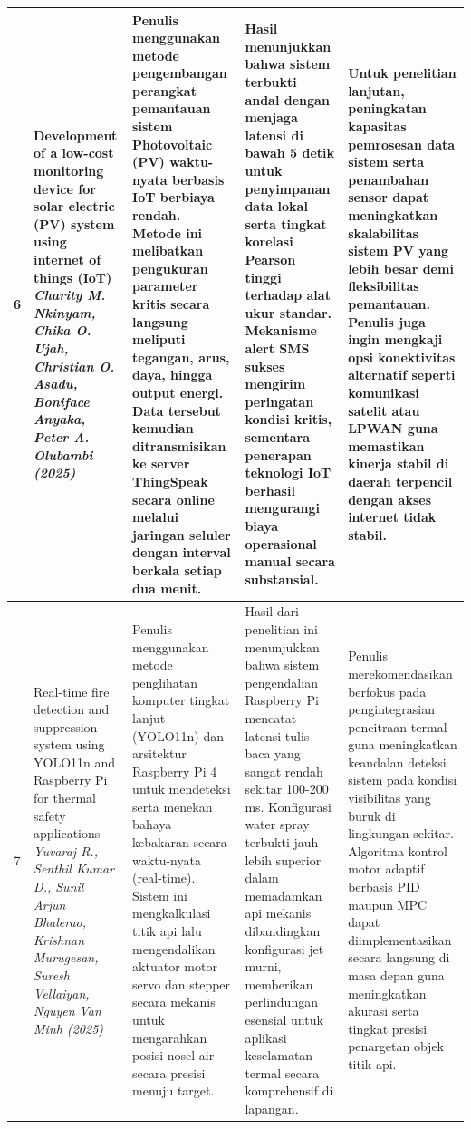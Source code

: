 \documentclass[11pt,a4paper]{article}
\begin{document}
\begin{small}
\begin{longtable}{|c|>{\raggedright\arraybackslash}p{3.2cm}|>{\raggedright\arraybackslash}p{4cm}|>{\raggedright\arraybackslash}p{4cm}|>{\raggedright\arraybackslash}p{4cm}|}
6 & Development of a low-cost monitoring device for solar electric (PV) system using internet of things (IoT) \newline \newline \textit{Charity M. Nkinyam, Chika O. Ujah, Christian O. Asadu, Boniface Anyaka, Peter A. Olubambi (2025)} & Penulis menggunakan metode pengembangan perangkat pemantauan sistem Photovoltaic (PV) waktu-nyata berbasis IoT berbiaya rendah. Metode ini melibatkan pengukuran parameter kritis secara langsung meliputi tegangan, arus, daya, hingga output energi. Data tersebut kemudian ditransmisikan ke server ThingSpeak secara online melalui jaringan seluler dengan interval berkala setiap dua menit. & Hasil menunjukkan bahwa sistem terbukti andal dengan menjaga latensi di bawah 5 detik untuk penyimpanan data lokal serta tingkat korelasi Pearson tinggi terhadap alat ukur standar. Mekanisme alert SMS sukses mengirim peringatan kondisi kritis, sementara penerapan teknologi IoT berhasil mengurangi biaya operasional manual secara substansial. & Untuk penelitian lanjutan, peningkatan kapasitas pemrosesan data sistem serta penambahan sensor dapat meningkatkan skalabilitas sistem PV yang lebih besar demi fleksibilitas pemantauan. Penulis juga ingin mengkaji opsi konektivitas alternatif seperti komunikasi satelit atau LPWAN guna memastikan kinerja stabil di daerah terpencil dengan akses internet tidak stabil. \\
\hline

7 & Real-time fire detection and suppression system using YOLO11n and Raspberry Pi for thermal safety applications \newline \newline \textit{Yuvaraj R., Senthil Kumar D., Sunil Arjun Bhalerao, Krishnan Murugesan, Suresh Vellaiyan, Nguyen Van Minh (2025)} & Penulis menggunakan metode penglihatan komputer tingkat lanjut (YOLO11n) dan arsitektur Raspberry Pi 4 untuk mendeteksi serta menekan bahaya kebakaran secara waktu-nyata (real-time). Sistem ini mengkalkulasi titik api lalu mengendalikan aktuator motor servo dan stepper secara mekanis untuk mengarahkan posisi nosel air secara presisi menuju target. & Hasil dari penelitian ini menunjukkan bahwa sistem pengendalian Raspberry Pi mencatat latensi tulis-baca yang sangat rendah sekitar 100-200 ms. Konfigurasi water spray terbukti jauh lebih superior dalam memadamkan api mekanis dibandingkan konfigurasi jet murni, memberikan perlindungan esensial untuk aplikasi keselamatan termal secara komprehensif di lapangan. & Penulis merekomendasikan berfokus pada pengintegrasian pencitraan termal guna meningkatkan keandalan deteksi sistem pada kondisi visibilitas yang buruk di lingkungan sekitar. Algoritma kontrol motor adaptif berbasis PID maupun MPC dapat diimplementasikan secara langsung di masa depan guna meningkatkan akurasi serta tingkat presisi penargetan objek titik api. \\
\hline


\end{longtable}
\end{small}
\end{document}
